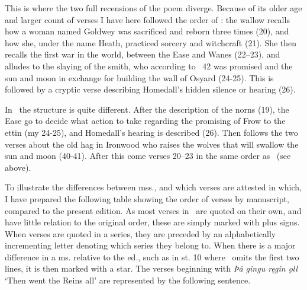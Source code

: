 This is where the two full recensions of the poem diverge. Because of its older age and larger count of verses I have here followed the order of \Regius: the wallow recalls how a woman named Goldwey was sacrificed and reborn three times (20), and how she, under the name Heath, practiced sorcery and witchcraft (21). She then recalls the first war in the world, between the Ease and Wanes (22–23), and alludes to the slaying of the smith, who according to \Gylfaginning\ 42 was promised  and the sun and moon in exchange for building the wall of Osyard (24-25). This is followed by a cryptic verse describing Homedall’s hidden silence or hearing (26).

In \Hauksbok\ the structure is quite different. After the description of the norns (19), the Ease go to decide what action to take regarding the promising of Frow to the ettin (my 24-25), and Homedall’s hearing is described (26). Then follows the two verses about the old hag in Ironwood who raises the wolves that will swallow the sun and moon (40-41). After this come verses 20–23 in the same order as \Regius\ (see above).

To illustrate the differences between mss., and which verses are attested in which, I have prepared the following table showing the order of verses by manuscript, compared to the present edition. As most verses in \GylfMS\ are quoted on their own, and have little relation to the original order, these are simply marked with plus signs. When verses are quoted in a series, they are preceded by an alphabetically incrementing letter denoting which series they belong to. When there is a major difference in a ms. relative to the ed., such as in st. 10 where \GylfMS\ omits the first two lines, it is then marked with a star. The verses beginning with \emph{Þȧ gingu ręgin ǫll} ‘Then went the Reins all’ are represented by the following sentence.

